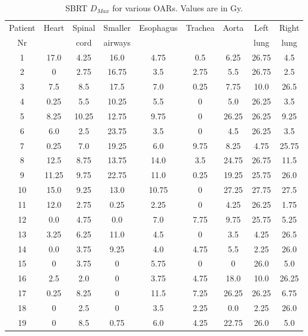 \documentclass[type=dr, dr=rernat, accentcolor=tud7b,colorbacktitle, bigchapter, openright, twoside, 12pt ]{tudthesis}
\begin{document}
\begin{table}[H]
  \centering
  \caption{SBRT $D_{Max}$ for various OARs. Values are in Gy.}
  \begin{tabular}{c|c|c|c|c|c|c|c|c}
   Patient & \multirow{2}{*}{Heart} & Spinal  & Smaller  & \multirow{2}{*}{Esophagus} & \multirow{2}{*}{Trachea} & \multirow{2}{*}{Aorta} & Left  & Right \\
   Nr & & cord & airways & & & & lung & lung \\
 \hline\hline 
1 & 17.0 & 4.25 & 16.0 & 4.75 & 0.5 & 6.25 & 26.75 & 4.5\\
2 & 0 & 2.75 & 16.75 & 3.5 & 2.75 & 5.5 & 26.75 & 2.5\\
3 & 7.5 & 8.5 & 17.5 & 7.0 & 0.25 & 7.75 & 10.0 & 26.5\\
4 & 0.25 & 5.5 & 10.25 & 5.5 & 0 & 5.0 & 26.25 & 3.5\\
5 & 8.25 & 10.25 & 12.75 & 9.75 & 0 & 26.25 & 26.25 & 9.25\\
6 & 6.0 & 2.5 & 23.75 & 3.5 & 0 & 4.5 & 26.25 & 3.5\\
7 & 0.25 & 7.0 & 19.25 & 6.0 & 9.75 & 8.25 & 4.75 & 25.75\\
8 & 12.5 & 8.75 & 13.75 & 14.0 & 3.5 & 24.75 & 26.75 & 11.5\\
9 & 11.25 & 9.75 & 22.75 & 11.0 & 0.25 & 19.25 & 25.75 & 26.0\\
10 & 15.0 & 9.25 & 13.0 & 10.75 & 0 & 27.25 & 27.75 & 27.5\\
11 & 12.0 & 2.75 & 0.25 & 2.25 & 0 & 4.25 & 26.25 & 1.75\\
12 & 0.0 & 4.75 & 0.0 & 7.0 & 7.75 & 9.75 & 25.75 & 5.25\\
13 & 3.25 & 6.25 & 11.0 & 4.5 & 0 & 3.5 & 4.25 & 26.5\\
14 & 0.0 & 3.75 & 9.25 & 4.0 & 4.75 & 5.5 & 2.25 & 26.0\\
15 & 0 & 3.75 & 0 & 5.75 & 0 & 0 & 26.0 & 5.0\\
16 & 2.5 & 2.0 & 0 & 3.75 & 4.75 & 18.0 & 10.0 & 26.25\\
17 & 0.25 & 8.25 & 0 & 11.5 & 7.25 & 26.25 & 26.25 & 6.75\\
18 & 0 & 2.5 & 0 & 3.5 & 2.25 & 0.0 & 2.25 & 26.0\\
19 & 0 & 8.5 & 0.75 & 6.0 & 4.25 & 22.75 & 26.0 & 5.0\\
\hline\hline
  \end{tabular}
  \label{tab:oarlimits2}
\end{table}
\newpage
\end{document}
